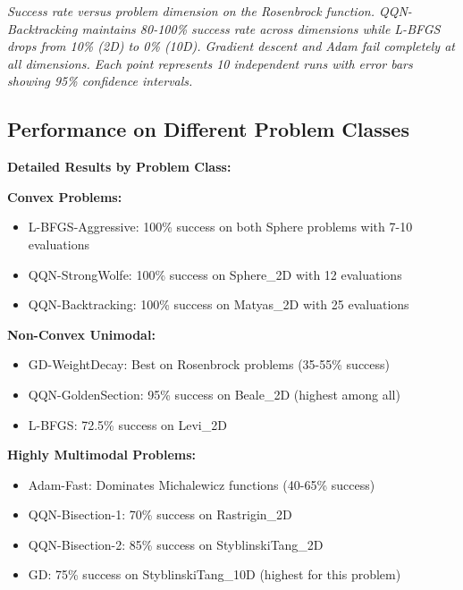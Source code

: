 \emph{Success rate versus problem dimension on the Rosenbrock function. QQN-Backtracking maintains 80-100\% success rate across dimensions while L-BFGS drops from 10\% (2D) to 0\% (10D). Gradient descent and Adam fail completely at all dimensions. Each point represents 10 independent runs with error bars showing 95\% confidence intervals.}

\hypertarget{performance-on-different-problem-classes}{%
\subsection{Performance on Different Problem Classes}\label{performance-on-different-problem-classes}}

\textbf{Detailed Results by Problem Class:}

\textbf{Convex Problems:}

\begin{itemize}
\tightlist
\item
  L-BFGS-Aggressive: 100\% success on both Sphere problems with 7-10 evaluations
\item
  QQN-StrongWolfe: 100\% success on Sphere\_2D with 12 evaluations
\item
  QQN-Backtracking: 100\% success on Matyas\_2D with 25 evaluations
\end{itemize}

\textbf{Non-Convex Unimodal:}

\begin{itemize}
\tightlist
\item
  GD-WeightDecay: Best on Rosenbrock problems (35-55\% success)
\item
  QQN-GoldenSection: 95\% success on Beale\_2D (highest among all)
\item
  L-BFGS: 72.5\% success on Levi\_2D
\end{itemize}

\textbf{Highly Multimodal Problems:}

\begin{itemize}
\tightlist
\item
  Adam-Fast: Dominates Michalewicz functions (40-65\% success)
\item
  QQN-Bisection-1: 70\% success on Rastrigin\_2D
\item
  QQN-Bisection-2: 85\% success on StyblinskiTang\_2D
\item
  GD: 75\% success on StyblinskiTang\_10D (highest for this problem)
\end{itemize}

